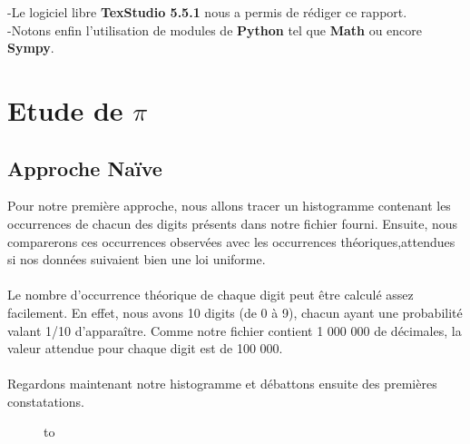 \documentclass[french]{article}
\begin{document}
-Le logiciel libre \textbf{TexStudio 5.5.1} nous a permis de rédiger ce rapport.
\\

-Notons enfin l'utilisation de modules de \textbf{Python} tel que \textbf{Math} ou encore \textbf{Sympy}.

\section{Etude de $\pi$ }
\subsection{Approche Naïve}
Pour notre première approche, nous allons tracer un histogramme contenant les occurrences de chacun des digits présents dans notre fichier fourni. Ensuite, nous comparerons ces occurrences observées avec les occurrences théoriques,attendues si nos données suivaient bien une loi uniforme. 
\\
\\
Le nombre d'occurrence théorique de chaque digit peut être calculé assez facilement. En effet, nous avons 10 digits (de 0 à 9), chacun ayant une probabilité valant 1/10 d'apparaître. Comme notre fichier contient 1 000 000 de décimales, la valeur attendue pour chaque digit est de 100 000.
\\
\\
Regardons maintenant notre histogramme et débattons ensuite des premières constatations.

\begin{figure}[h!]
	\hbox to
	\caption{\label{toucan}}
\end{figure}
\end{document}
